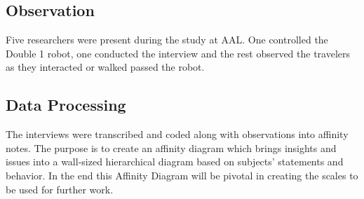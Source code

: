 \subsection{Observation}
Five researchers were present during the study at AAL. One controlled the Double 1 robot, one conducted the interview and the rest observed the travelers as they interacted or walked passed the robot. 

\subsection{Data Processing}
The interviews were transcribed and coded along with observations into affinity notes. The purpose is to create an affinity diagram \cite{Wendell2005} which brings insights and issues into a wall-sized hierarchical diagram based on subjects' statements and behavior. In the end this Affinity Diagram will be pivotal in creating the scales to be used for further work.




